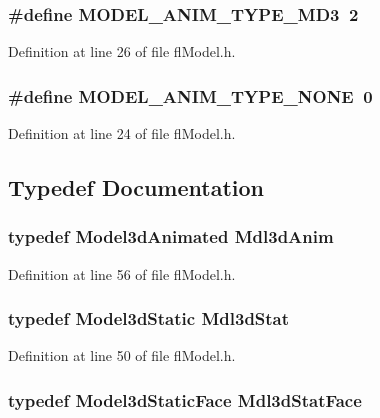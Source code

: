 \subsubsection{\setlength{\rightskip}{0pt plus 5cm}\#define MODEL\_\-ANIM\_\-TYPE\_\-MD3~2}\label{flModel_8h_b1906d93e0192e7135f3ccfbee63b76e}




Definition at line 26 of file fl\-Model.h.
\subsubsection{\setlength{\rightskip}{0pt plus 5cm}\#define MODEL\_\-ANIM\_\-TYPE\_\-NONE~0}\label{flModel_8h_36164ac4eb0e2f2ea9dd071949f00268}




Definition at line 24 of file fl\-Model.h.

\subsection{Typedef Documentation}
\subsubsection{\setlength{\rightskip}{0pt plus 5cm}typedef {\bf Model3d\-Animated} {\bf Mdl3d\-Anim}}\label{flModel_8h_ef66f26d4b0a01ab1ca40fa7edab544c}




Definition at line 56 of file fl\-Model.h.
\subsubsection{\setlength{\rightskip}{0pt plus 5cm}typedef {\bf Model3d\-Static} {\bf Mdl3d\-Stat}}\label{flModel_8h_381a803dc5cd951f98c0ce00b815ab87}




Definition at line 50 of file fl\-Model.h.
\subsubsection{\setlength{\rightskip}{0pt plus 5cm}typedef {\bf Model3d\-Static\-Face} {\bf Mdl3d\-Stat\-Face}}\label{flModel_8h_d2d606c3d1e86af6a9d92f96fe5aa7e4}




